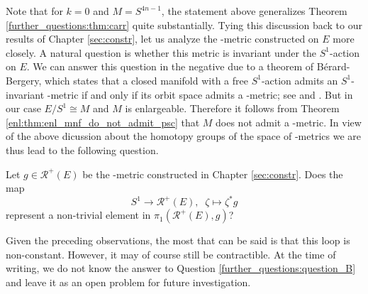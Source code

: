 Note that for $k=0$ and $M=S^{4n-1}$, the statement above generalizes Theorem \ref{further_questions:thm:carr} quite substantially. Tying this discussion back to our results of Chapter \ref{sec:constr}, let us analyze the \psc-metric constructed on $E$ more closely. A natural question is whether this metric is invariant under the $S^1$-action on $E$. We can answer this question in the negative due to a theorem of Bérard-Bergery, which states that a closed manifold with a free $S^1$-action admits an $S^1$-invariant \psc-metric if and only if its orbit space admits a \psc-metric; see \cite[Theorem C]{BerardBergery1983} and \cite[Theorem 2.2]{Wiemeler2016}. But in our case $E / S^1 \cong M$ and $M$ is enlargeable. Therefore it follows from Theorem \ref{enl:thm:enl_mnf_do_not_admit_psc} that $M$ does not admit a \psc-metric. In view of the above dicussion about the homotopy groups of the space of \psc-metrics we are thus lead to the following question.

\begin{question}
	\label{further_questions:question_B}
	Let $g \in \mathcal{R}^+(E)$ be the \psc-metric constructed in Chapter \ref{sec:constr}. Does the map 
	\[
	S^1 \to \mathcal{R}^+(E), \;\; \zeta \mapsto \zeta^\ast g
	\] 
	represent a non-trivial element in $\pi_1(\mathcal{R}^+(E),g)$?
\end{question}

Given the preceding observations, the most that can be said is that this loop is non-constant. However, it may of course still be contractible. At the time of writing, we do not know the answer to Question \ref{further_questions:question_B} and leave it as an open problem for future investigation.

